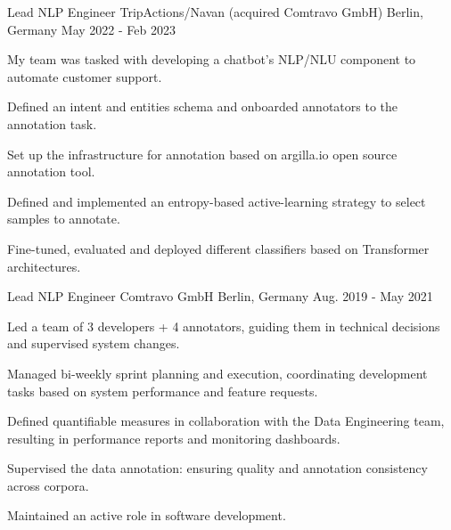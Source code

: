 \begin{cventries}
  \cventry
    {Lead NLP Engineer} %
    {TripActions/Navan (acquired Comtravo GmbH)} %
    {Berlin, Germany} %
    {May 2022 - Feb 2023} %
	{
      \begin{cvitems} %
		\item {My team was tasked with developing a chatbot's NLP/NLU component to automate customer support.}
		\item {Defined an intent and entities schema and onboarded annotators to the annotation task.}
		\item {Set up the infrastructure for annotation based on argilla.io open source annotation tool.}
		\item {Defined and implemented an entropy-based active-learning strategy to select samples to annotate.}
		\item {Fine-tuned, evaluated and deployed different classifiers based on Transformer architectures.}
      \end{cvitems}
    }



\cventry
    {Lead NLP Engineer} 
    {Comtravo GmbH} 
    {Berlin, Germany} 
    {Aug. 2019 - May 2021}
    {
      \begin{cvitems} 
		  \item {Led a team of 3 developers + 4 annotators, guiding them in technical decisions and supervised system changes.}
		  \item {Managed bi-weekly sprint planning and execution, coordinating development tasks based on system performance and feature requests.}
		  \item {Defined quantifiable measures in collaboration with the Data Engineering team, resulting in performance reports and monitoring dashboards.}
		  \item {Supervised the data annotation: ensuring quality and annotation consistency across corpora.}
		  \item {Maintained an active role in software development.}
        \end{cvitems}
 	}



\end{cventries}
